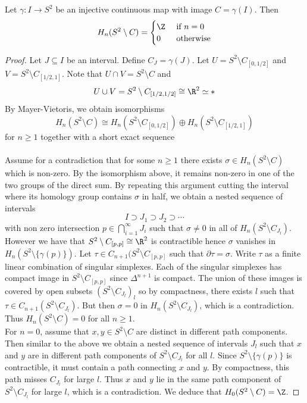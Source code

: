 \documentclass[a4paper]{article}
\begin{document}
\begin{lmm}{}{} Let $\gamma:I\to S^2$ be an injective continuous map with image $C=\gamma(I)$. Then $$H_n(S^2\setminus C)=\begin{cases}
\Z & \text{ if } n=0\\
0 & \text{ otherwise}
\end{cases}$$ 
\begin{proof}
Let $J\subseteq I$ be an interval. Define $C_J=\gamma(J)$. Let $U=S^2\setminus C_{[0,1/2]}$ and $V=S^2\setminus C_{[1/2,1]}$. Note that $U\cap V=S^2\setminus C$ and $$U\cup V=S^2\setminus C_{[1/2,1/2]}\cong\R^2\simeq\ast$$ By Mayer-Vietoris, we obtain isomorphisms $$H_n(S^2\setminus C)\cong H_n(S^2\setminus C_{[0,1/2]})\oplus H_n(S^2\setminus C_{[1/2,1]})$$ for $n\geq 1$ together with a short exact sequence \\
\\
Assume for a contradiction that for some $n\geq 1$ there exists $\sigma\in H_n(S^2\setminus C)$ which is non-zero. By the isomorphism above, it remains non-zero in one of the two groups of the direct sum. By repeating this argument cutting the interval where its homology group contains $\sigma$ in half, we obtain a nested sequence of intervals $$I\supset J_1\supset J_2\supset\cdots$$ with non zero intersection $p\in\bigcap_{i=1}^\infty J_i$ such that $\sigma\neq 0$ in all of $H_n(S^2\setminus C_{J_l})$. However we have that $S^2\setminus C_{[p,p]}\cong\R^2$ is contractible hence $\sigma$ vanishes in $H_n(S^2\setminus\{\gamma(p)\})$. Let $\tau\in C_{n+1}(S^2\setminus C_{[p,p]}$ such that $\partial\tau=\sigma$. Write $\tau$ as a finite linear combination of singular simplexes. Each of the singular simplexes has compact image in $S^2\setminus C_{[p,p]}$ since $\Delta^{n+1}$ is compact. The union of these images is covered by open subsets $(S^2\setminus C_{J_l})_l$ so by compactness, there exists $l$ such that $\tau\in C_{n+1}(S^2\setminus C_{J_l})$. But then $\sigma=0$ in $H_n(S^2\setminus C_{J_l})$, which is a contradiction. Thus $H_n(S^2\setminus C)=0$ for all $n\geq 1$. \\

For $n=0$, assume that $x,y\in S^2\setminus C$ are distinct in different path components. Then similar to the above we obtain a nested sequence of intervals $J_l$ such that $x$ and $y$ are in different path components of $S^2\setminus C_{J_l}$ for all $l$. Since $S^2\setminus\{\gamma(p)\}$ is contractible, it must contain a path connecting $x$ and $y$. By compactness, this path misses $C_{J_l}$ for large $l$. Thus $x$ and $y$ lie in the same path component of $S^2\setminus C_{J_l}$ for large $l$, which is a contradiction. We deduce that $H_0(S^2\setminus C)=\Z$. 
\end{proof}
\end{lmm}
\end{document}
